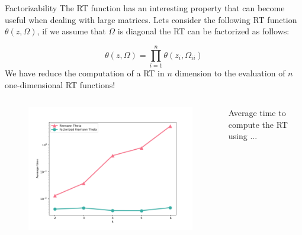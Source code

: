 \documentclass[10pt]{beamer}
\begin{document}


\begin{frame}{Factorizability}
    The RT function has an interesting property that can become useful when dealing with large matrices.
    Lets consider the following RT function $\theta(z, \Omega)$, if we assume that $\Omega$ 
    is diagonal the RT can be factorized as follows:

    \begin{equation}
        \theta(z, \Omega) = \prod_{i=1}^n \theta(z_i, \Omega_{ii})
    \end{equation}
    We have reduce the computation of a RT in $n$ dimension to the evaluation of $n$ one-dimensional
        RT functions!
    \vspace{-0.7cm}
    \begin{columns}
        \begin{column}{0.7 \textwidth}
            \begin{figure}
                \begin{center}
                    \includegraphics[scale=0.5]{figures/factorized.png}
                \end{center}
            \end{figure}
        \end{column}
        \begin{column}{0.3 \textwidth}
            Average time to compute the RT using ...
            

\end{column}
\end{columns}
\end{frame}
\end{document}
